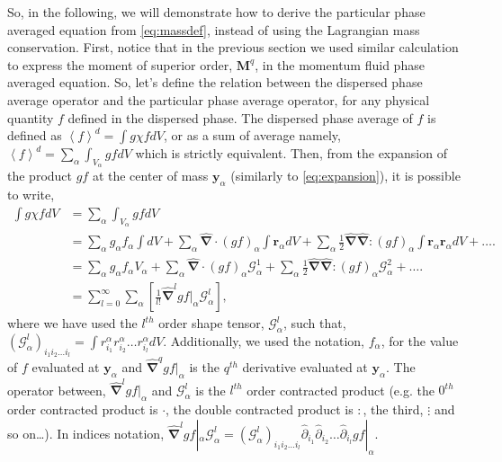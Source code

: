 So, in the following, we will demonstrate how to derive the particular phase averaged equation from \ref{eq:massdef}, instead of using the Lagrangian mass conservation. 
First, notice that in the previous section we used similar calculation to express the moment of superior order, $\bm{M}^q$, in the momentum fluid phase averaged equation. 
So, let's define the relation between the dispersed phase average operator and the particular phase average operator, for any physical quantity  $f$ defined in the dispersed phase.
The dispersed phase average of $f$ is defined as $\left<f\right>^d = \int g\chi f dV$, or as a sum of average namely, $\left<f\right>^d = \sum_\alpha \int_{V_\alpha}g f dV$ which is strictly equivalent.
Then, from the expansion of the product $gf$ at the center of mass $\bm{y}_\alpha$ (similarly to \ref{eq:expansion}), it is possible to write, 
\begin{align}
    \int g \chi f  dV 
    &= \sum_\alpha \int_{V_\alpha} g f  dV \\
    &= \sum_\alpha g_\alpha f_\alpha \int   dV 
    + \sum_\alpha  \hat{\bm{\nabla}} \cdot (g f)_\alpha \int \bm{r}_\alpha dV 
    + \sum_\alpha \frac{1}{2}\hat{\bm{\nabla}}\hat{\bm{\nabla}} : (g f)_\alpha \int \bm{r}_\alpha\bm{r}_\alpha dV 
    + \ldots. \\
    &= \sum_\alpha g_\alpha f_\alpha V_\alpha 
    + \sum_\alpha  \hat{\bm{\nabla}} \cdot (g f)_\alpha \mathcal{G}_\alpha^1 
    + \sum_\alpha \frac{1}{2}\hat{\bm{\nabla}}\hat{\bm{\nabla}} : (g f)_\alpha \mathcal{G}_\alpha^2 
    + \ldots. \\
    \label{eq:exp}
    &= \sum_{l=0}^\infty \sum_\alpha \left[\frac{1}{l!} \hat{\bm{\nabla}}^l gf|_\alpha \mathcal{G}_\alpha^l\right],
\end{align}
where we have used the $l^{th}$ order shape tensor, $\mathcal{G}_\alpha^l$, such that, $(\mathcal{G}_\alpha^l)_{i_1 i_2\ldots i_l} = \int r^\alpha_{i_1}r^\alpha_{i_2}\ldots r^\alpha_{i_l}dV$.
Additionally, we used the notation, $f_\alpha$, for the value of $f$ evaluated at $\bm{y}_\alpha$ and $\hat{\bm{\nabla}}^q gf|_\alpha$ is the $q^{th}$ derivative evaluated at $\bm{y}_\alpha$.
The operator between, $\hat{\bm{\nabla}}^l gf|_\alpha$ and $\mathcal{G}_\alpha^l$ is the $l^{th}$ order contracted product (e.g. the $0^{th}$ order contracted product is $\cdot$, the double contracted product is $:$, the third, $\vdots$ and so on\ldots). 
In indices notation, $\hat{\bm{\nabla}}^l gf|_\alpha \mathcal{G}_\alpha^l  = (\mathcal{G}_\alpha^l)_{i_1 i_2\ldots i_l} \hat{\partial}_{i_1} \hat{\partial}_{i_2}\ldots \hat{\partial}_{i_l} gf|_\alpha$.
